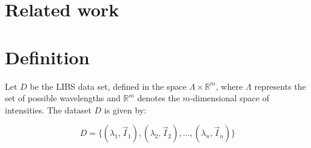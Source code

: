 \section{Related work}



\section{Definition}
Let $D$ be the LIBS data set, defined in the space $\Lambda \times \mathbb{R}^m$, where $\Lambda$ represents the set of possible wavelengths and $\mathbb{R}^m$ denotes the $m$-dimensional space of intensities.
The dataset $D$ is given by:

\begin{equation}
    D = \{ (\lambda_1, \vec{I}_1), (\lambda_2, \vec{I}_2), \ldots, (\lambda_n, \vec{I}_n) \}
\end{equation}

